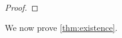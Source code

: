 \documentclass[11pt]{article}
\newcommand{\ex}{\mathop{{}\mathbb{E}}}
\newcommand{\rank}{\mathrm{rank}}
\begin{document}
\begin{proof}
\end{proof}

We now prove \cref{thm:existence}.
\end{document}

